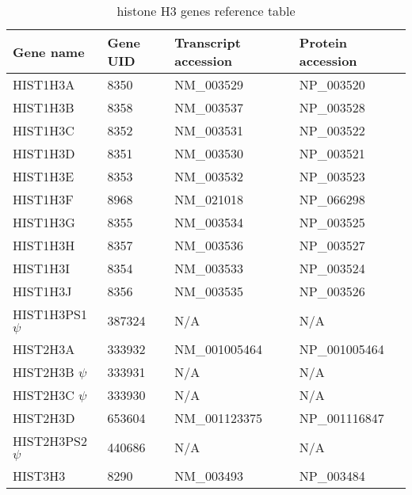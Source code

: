 \documentclass[10pt,a4paper,draft]{article}
\begin{document}
    \begin{table}
      \centering
      \begin{tabular}{l | l | l | l }
        Gene name & Gene UID & Transcript accession & Protein accession \\
        \hline
         HIST1H3A & 8350 & NM\_003529 & NP\_003520 \\
         HIST1H3B & 8358 & NM\_003537 & NP\_003528 \\
         HIST1H3C & 8352 & NM\_003531 & NP\_003522 \\
         HIST1H3D & 8351 & NM\_003530 & NP\_003521 \\
         HIST1H3E & 8353 & NM\_003532 & NP\_003523 \\
         HIST1H3F & 8968 & NM\_021018 & NP\_066298 \\
         HIST1H3G & 8355 & NM\_003534 & NP\_003525 \\
         HIST1H3H & 8357 & NM\_003536 & NP\_003527 \\
         HIST1H3I & 8354 & NM\_003533 & NP\_003524 \\
         HIST1H3J & 8356 & NM\_003535 & NP\_003526 \\
         HIST1H3PS1 $\psi$ & 387324 & N/A & N/A \\
         HIST2H3A & 333932 & NM\_001005464 & NP\_001005464 \\
         HIST2H3B $\psi$ & 333931 & N/A & N/A \\
         HIST2H3C $\psi$ & 333930 & N/A & N/A \\
         HIST2H3D & 653604 & NM\_001123375 & NP\_001116847 \\
         HIST2H3PS2 $\psi$ & 440686 & N/A & N/A \\
         HIST3H3 & 8290 & NM\_003493 & NP\_003484 \\
      \end{tabular}
      \caption{histone H3 genes reference table}
      \label{tab:h3-ref}
    \end{table}
\end{document}

